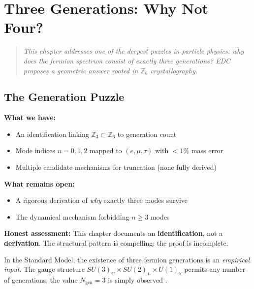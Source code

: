\chapter{Three Generations: Why Not Four?}
\label{ch:generations}

\begin{quote}
\textit{This chapter addresses one of the deepest puzzles in particle physics:
why does the fermion spectrum consist of exactly three generations?
EDC proposes a geometric answer rooted in $\mathbb{Z}_6$ crystallography.}
\end{quote}

\section{The Generation Puzzle}
\label{sec:gen_puzzle}

\begin{tcolorbox}[edcGuardrail, title=\textbf{Epistemic Status: HIGH RISK}]
\textbf{What we have:}
\begin{itemize}[nosep]
    \item An identification linking $\mathbb{Z}_3 \subset \mathbb{Z}_6$ to generation count \tagI{}
    \item Mode indices $n = 0, 1, 2$ mapped to $(e, \mu, \tau)$ with $<1\%$ mass error \tagI{}
    \item Multiple candidate mechanisms for truncation (none fully derived)
\end{itemize}

\textbf{What remains open:}
\begin{itemize}[nosep]
    \item A rigorous derivation of \emph{why} exactly three modes survive
    \item The dynamical mechanism forbidding $n \geq 3$ modes
\end{itemize}

\textbf{Honest assessment:} This chapter documents an \textbf{identification}, not a
\textbf{derivation}. The structural pattern is compelling; the proof is incomplete.
\end{tcolorbox}

In the Standard Model, the existence of three fermion generations is an
\emph{empirical input}. The gauge structure $SU(3)_C \times SU(2)_L \times U(1)_Y$
permits any number of generations; the value $N_{\text{gen}} = 3$ is simply
observed \tagBL{}.


